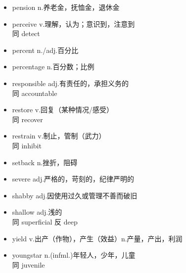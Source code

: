 \documentclass[11pt,a4paper,UTF8,titlepage]{ctexart} %
\begin{document}
\begin{multicols}{2}
\begin{itemize}
        \item pension n.养老金，抚恤金，退休金
        \item perceive v.理解，认为；意识到，注意到\\同 detect
        \item percent n./adj.百分比
        \item percentage n.百分数；比例
        \item responsible adj.有责任的，承担义务的\\同 accountable
        \item restore v.回复（某种情况/感受）\\同 recover
        \item restrain v.制止，管制（武力）\\同 inhibit
        \item setback n.挫折，阻碍
        \item severe adj.严格的，苛刻的，纪律严明的
        \item shabby adj.因使用过久或管理不善而破旧
        \item shallow adj.浅的\\同 superficial 反 deep
        \item yield v.出产（作物），产生（效益）n.产量，产出，利润
        \item youngstar n.(infml.)年轻人，少年，儿童\\同 juvenile
    \end{itemize}
    \end{multicols}
\end{document}
